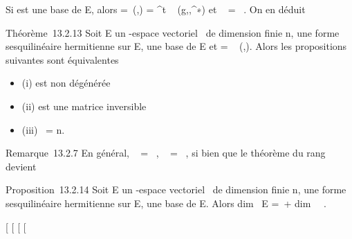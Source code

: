 Si  est une base de E, alors \Omega =\
\mathrmMat (\phi,) =
^t \mathrmMat~
(g\phi,,^∗) et
\mathrmrg~\phi
= \mathrmrg~\Omega. On en déduit

Théorème~13.2.13 Soit E un -espace vectoriel ~de dimension finie n, \phi
une forme sesquilinéaire hermitienne sur E,  une base de E et \Omega
= \mathrmMat~ (\phi,\mathcal{E}). Alors
les propositions suivantes sont équivalentes

\begin{itemize}
\itemsep1pt\parskip0pt
\item
  (i) \phi est non dégénérée
\item
  (ii) \Omega est une matrice inversible
\item
  (iii) \mathrmrg~\phi = n.
\end{itemize}

Remarque~13.2.7 En général,
\mathrmKer~\phi
= \mathrmKerg\phi~,
\mathrmrg~\phi
= \mathrmrgg\phi~, si
bien que le théorème du rang devient

Proposition~13.2.14 Soit E un -espace vectoriel ~de dimension finie n,
\phi une forme sesquilinéaire hermitienne sur E, \mathcal{E} une base de E. Alors
dim~ E =\
\mathrmrg\phi + dim~
\mathrmKer~\phi.

{[}
{[}
{[}
{[}
